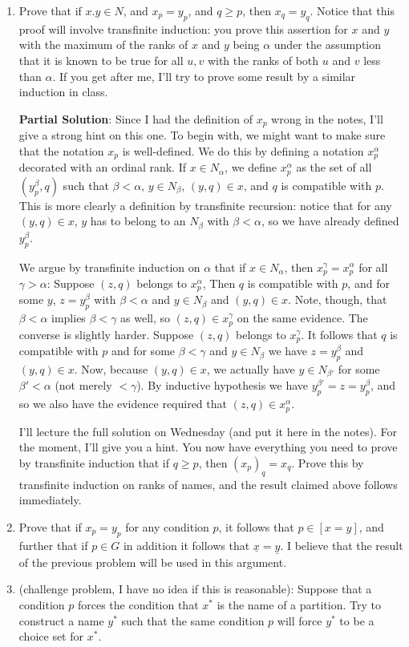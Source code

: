 \documentclass[12pt]{book}
\begin{document}
\begin{enumerate}
\item  Prove that if $x.y \in N$, and $x_p=y_p$, and $q \geq p$, then $x_q = y_q$.  Notice that this proof will involve transfinite induction:  you prove this assertion for $x$ and $y$ with the maximum of the ranks of $x$ and $y$ being $\alpha$ under the assumption that it is known to be true for all $u,v$ with the ranks of both $u$ and $v$ less than $\alpha$.  If you get after me, I'll try to prove some result by a similar induction in class.

{\bf Partial Solution}:  Since I had the definition of $x_p$ wrong in the notes, I'll give a strong hint on this one.  To begin with, we might want to make sure that
the notation $x_p$ is well-defined.  We do this by defining a notation $x_p^{\alpha}$ decorated with an ordinal rank.  If $x \in N_{\alpha}$,
we define $x_p^{\alpha}$ as the set of all $(y_p^{\beta},q)$ such that $\beta<\alpha$, $y \in N_{\beta}$, $(y,q) \in x$, and $q$ is compatible with $p$.  This is more clearly a definition by transfinite recursion:  notice that for any $(y,q) \in x$, $y$ has to belong to an $N_{\beta}$ with $\beta<\alpha$, so we have already defined $y^{\beta}_p$.

We argue by transfinite induction on $\alpha$ that if $x \in N_{\alpha}$, then $x^{\gamma}_p = x^{\alpha}_p$ for all $\gamma>\alpha$:
Suppose $(z,q)$ belongs to $x^{\alpha}_p$,  Then $q$ is compatible with $p$, and for some $y$, $z=y_p^{\beta}$ with $\beta<\alpha$ and $y \in N_{\beta}$ and $(y,q) \in x$.  Note, though, that $\beta<\alpha$ implies $\beta<\gamma$ as well, so $(z,q) \in x^{\gamma}_p$ on the same evidence.  The converse is slightly harder.  Suppose $(z,q)$ belongs to $x^{\gamma}_p$.  It follows that $q$ is compatible with $p$
and for some $\beta<\gamma$ and $y \in N_{\beta}$ we have $z=y^{\beta}_p$ and $(y,q) \in x$.  Now, because $(y,q) \in x$, we actually
have $y \in N_{\beta'}$ for some $\beta'<\alpha$ (not merely $<\gamma$).  By inductive hypothesis we have $y^{\beta'}_p = z= y^{\beta}_p$,
and so we also have the evidence required that $(z,q) \in x^{\alpha}_p$.

I'll lecture the full solution on Wednesday (and put it here in the notes).  For the moment, I'll give you a hint.   You now have everything
you need to prove by transfinite induction that if $q \geq p$, then $(x_p)_q = x_q$.  Prove this by transfinite induction on ranks of names, and the result claimed above follows immediately.

\item Prove that if $x_p = y_p$ for any condition $p$, it follows that $p \in [x=y]$, and further that if $p \in G$ in addition it follows that $\underline{x} = \underline{y}$.  I believe that the result of the previous problem will be used in this argument.

\item (challenge problem, I have no idea if this is reasonable):  Suppose that a condition $p$ forces the condition that $x^*$ is the name of a partition.
Try to construct a name $y^*$ such that the same condition $p$ will force $y^*$ to be a choice set for $x^*$.

\end{enumerate}
\end{document}
